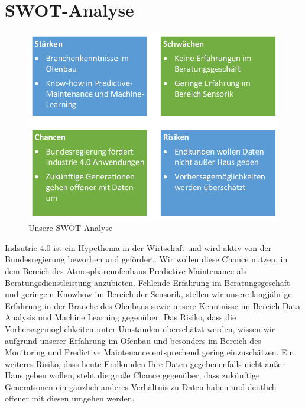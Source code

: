 \section{SWOT-Analyse}
		
\begin{figure}[H]
\centering
\includegraphics[width=0.7\linewidth]{Bilder/SWOT}
\caption{Unsere SWOT-Analyse}
\label{fig:SWOT}
\end{figure}


Indsutrie 4.0 ist ein Hypethema in der Wirtschaft und wird aktiv von der Bundesregierung beworben und gefördert. Wir wollen diese Chance nutzen, in dem Bereich des Atmosphärenofenbaus Predictive Maintenance als Beratungsdienstleistung anzubieten. Fehlende Erfahrung im Beratungsgeschäft und geringem Knowhow im Bereich der Sensorik, stellen wir unsere langjährige Erfahrung in der Branche des Ofenbaus sowie unsere Kenntnisse im Bereich Data Analysis und Machine Learning gegenüber. Das Risiko, dass die Vorhersagemöglichkeiten unter Umständen überschätzt werden, wissen wir aufgrund unserer Erfahrung im Ofenbau und besonders im Bereich des Monitoring und Predictive Maintenance entsprechend gering einzuschätzen. Ein weiteres Risiko, dass heute Endkunden Ihre Daten gegebenenfalls nicht außer Haus geben wollen, steht die große Chance gegenüber, dass zukünftige Generationen ein gänzlich anderes Verhältnis zu Daten haben und deutlich offener mit diesen umgehen werden.
